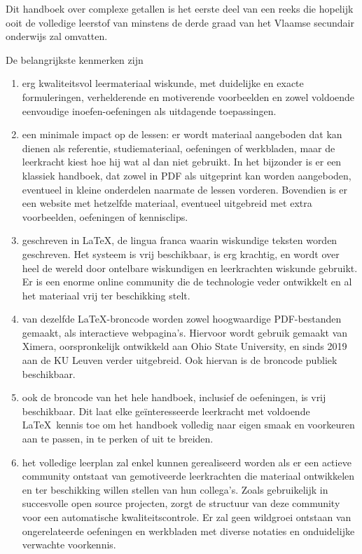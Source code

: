 \documentclass{ximera}
\begin{document}
	\author{Wim Obbels}
	\label{xim:xuitleg_leerkrachten}

    Dit handboek over complexe getallen is het eerste deel van een reeks die hopelijk ooit de volledige leerstof van minstens de derde graad van het Vlaamse secundair onderwijs zal omvatten.

    De belangrijkste kenmerken zijn
    \begin{enumerate}
        \item erg kwaliteitsvol leermateriaal wiskunde, met duidelijke en exacte formuleringen, verhelderende en motiverende voorbeelden en zowel voldoende eenvoudige inoefen-oefeningen als uitdagende toepassingen.
        \item een minimale impact op de lessen: er wordt materiaal aangeboden dat kan dienen als referentie, studiemateriaal, oefeningen of werkbladen, maar de leerkracht kiest hoe hij wat al dan niet gebruikt. In het bijzonder is er een klassiek handboek, dat zowel in PDF als uitgeprint kan worden aangeboden, eventueel in kleine onderdelen naarmate de lessen vorderen. Bovendien is er een website met hetzelfde materiaal, eventueel uitgebreid met extra voorbeelden, oefeningen of kennisclips.
        \item geschreven in \LaTeX, de lingua franca waarin wiskundige teksten worden geschreven. Het systeem is vrij beschikbaar, is erg krachtig, en wordt over heel de wereld door ontelbare wiskundigen en leerkrachten wiskunde gebruikt. Er is een enorme online community die de technologie veder ontwikkelt en al het materiaal vrij ter beschikking stelt.
        \item van dezelfde \LaTeX-broncode worden zowel hoogwaardige PDF-bestanden gemaakt, als interactieve webpagina's. Hiervoor wordt gebruik gemaakt van Ximera, oorspronkelijk ontwikkeld aan Ohio State University, en sinds 2019 aan de KU Leuven verder uitgebreid. Ook hiervan is de broncode publiek beschikbaar.
        \item ook de broncode van het hele handboek, inclusief de oefeningen, is vrij beschikbaar. Dit laat elke geïnteresseerde leerkracht met voldoende \LaTeX\ kennis toe om het handboek volledig naar eigen smaak en voorkeuren aan te passen, in te perken of uit te breiden.
        \item het volledige leerplan zal enkel kunnen gerealiseerd worden als er een actieve community ontstaat van gemotiveerde leerkrachten die materiaal ontwikkelen en ter beschikking willen stellen van hun collega's. Zoals gebruikelijk in succesvolle open source projecten, zorgt de structuur van deze community voor een automatische kwaliteitscontrole. Er zal geen wildgroei ontstaan van ongerelateerde oefeningen en werkbladen met diverse notaties en onduidelijke verwachte voorkennis. 

\end{enumerate}
\end{document}
